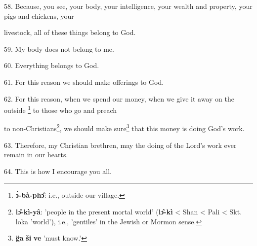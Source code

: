 58. Because, you see, your body, your intelligence, your wealth and property, your
pigs and chickens, your

livestock, all of these things belong to God.

59. My body does not belong to me.

60. Everything belongs to God.

61. For this reason we should make offerings to God.

62. For this reason, when we spend our money, when we give it away on the outside
\footnote{\textbf{ɔ̀-bà-phɔ̂}: i.e., outside our village.} to those who go and preach

to non-Christians\footnote{\textbf{lɔ̂-kì-yâ}: 'people in the present mortal world' (\textbf{lɔ̂-kì} < Shan < Pali < Skt. loka 'world'), i.e., 'gentiles' in the Jewish or Mormon sense.}, we should make sure\footnote{\textbf{g̈a} \textbf{ši} \textbf{ve} 'must know.'} that this money is doing God's
work.

63. Therefore, my Christian brethren, may the doing of the Lord's work ever remain
in our hearts.

64. This is how I encourage you all.

